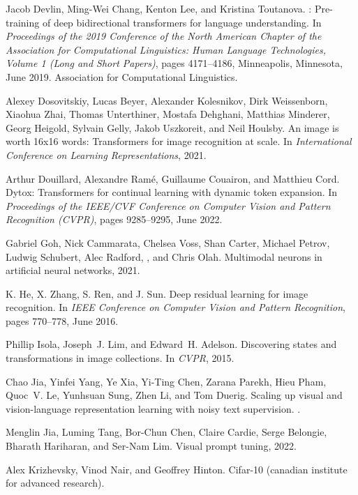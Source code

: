 \documentclass[10pt,twocolumn,letterpaper]{article}
\begin{document}
{\begin{thebibliography}{10}
Jacob Devlin, Ming-Wei Chang, Kenton Lee, and Kristina Toutanova.
: Pre-training of deep bidirectional transformers for language
  understanding.
\newblock In {\em Proceedings of the 2019 Conference of the North {A}merican
  Chapter of the Association for Computational Linguistics: Human Language
  Technologies, Volume 1 (Long and Short Papers)}, pages 4171--4186,
  Minneapolis, Minnesota, June 2019. Association for Computational Linguistics.

Alexey Dosovitskiy, Lucas Beyer, Alexander Kolesnikov, Dirk Weissenborn,
  Xiaohua Zhai, Thomas Unterthiner, Mostafa Dehghani, Matthias Minderer, Georg
  Heigold, Sylvain Gelly, Jakob Uszkoreit, and Neil Houlsby.
\newblock An image is worth 16x16 words: Transformers for image recognition at
  scale.
\newblock In {\em International Conference on Learning Representations}, 2021.

Arthur Douillard, Alexandre Ram\'e, Guillaume Couairon, and Matthieu Cord.
\newblock Dytox: Transformers for continual learning with dynamic token
  expansion.
\newblock In {\em Proceedings of the IEEE/CVF Conference on Computer Vision and
  Pattern Recognition (CVPR)}, pages 9285--9295, June 2022.

Gabriel Goh, Nick Cammarata, Chelsea Voss, Shan Carter, Michael Petrov, Ludwig
  Schubert, Alec Radford, , and Chris Olah.
\newblock Multimodal neurons in artificial neural networks, 2021.

K. He, X. Zhang, S. Ren, and J. Sun.
\newblock Deep residual learning for image recognition.
\newblock In {\em IEEE Conference on Computer Vision and Pattern Recognition},
  pages 770--778, June 2016.

Phillip Isola, Joseph~J. Lim, and Edward~H. Adelson.
\newblock Discovering states and transformations in image collections.
\newblock In {\em CVPR}, 2015.

Chao Jia, Yinfei Yang, Ye Xia, Yi-Ting Chen, Zarana Parekh, Hieu Pham, Quoc~V.
  Le, Yunhsuan Sung, Zhen Li, and Tom Duerig.
\newblock Scaling up visual and vision-language representation learning with
  noisy text supervision.
.

Menglin Jia, Luming Tang, Bor-Chun Chen, Claire Cardie, Serge Belongie, Bharath
  Hariharan, and Ser-Nam Lim.
\newblock Visual prompt tuning, 2022.

Alex Krizhevsky, Vinod Nair, and Geoffrey Hinton.
\newblock Cifar-10 (canadian institute for advanced research).


\end{thebibliography}}
\end{document}
